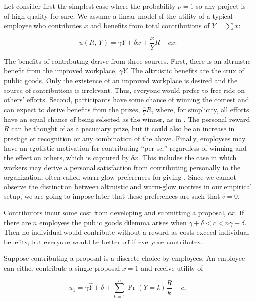 \documentclass[11pt, titlepage]{article}
\begin{document}
Let consider first the simplest case where the probability \(\nu=1\) so
any project is of high quality for sure. We assume a linear model of the
utility of a typical employee who contributes \(x\) and benefits from
total contributions of \(Y=\sum x\):

\begin{equation}\label{eq:utility}
  u(R,~ Y) =  \gamma Y + \delta x + \frac{x}{Y} R - c x.
\end{equation}

The benefits of contributing derive from three sources. First, there is
an altruistic benefit from the improved workplace, \(\gamma Y\). The
altruistic benefits are the crux of public goods. Only the existence of
an improved workplace is desired and the source of contributions is
irrelevant. Thus, everyone would prefer to free ride on others' efforts.
Second, participants have some chance of winning the contest and can
expect to derive benefits from the prizes, \(\frac{x}{Y} R\), where, for
simplicity, all efforts have an equal chance of being selected as the
winner, as in \citet{morgan2000financing}. The personal reward \(R\) can
be thought of as a pecuniary prize, but it could also be an increase in
prestige or recognition or any combination of the above. Finally,
employees may have an egotistic motivation for contributing ``per se,''
regardless of winning and the effect on others, which is captured by
\(\delta x\). This includes the case in which workers may derive a
personal satisfaction from contributing personally to the organization,
often called warm glow preferences for giving \citep{andreoni1995warm}.
Since we cannot observe the distinction between altruistic and warm-glow
motives in our empirical setup, we are going to impose later that these
preferences are such that \(\delta=0\).

Contributors incur some cost from developing and submitting a proposal,
\(c x\). If there are \(n\) employees the public goods dilemma arises
when \(\gamma+\delta < c < n\gamma+\delta\). Then no individual would
contribute without a reward as costs exceed individual benefits, but
everyone would be better off if everyone contributes.

Suppose contributing a proposal is a discrete choice by employees. An
employee can either contribute a single proposal \(x=1\) and receive
utility of

\begin{equation}
    u_1 = \gamma \hat Y + \delta + \sum_{k=1}^{n}\Pr(Y=k)\frac{R}{k}  - c, 
\end{equation}
\end{document}
